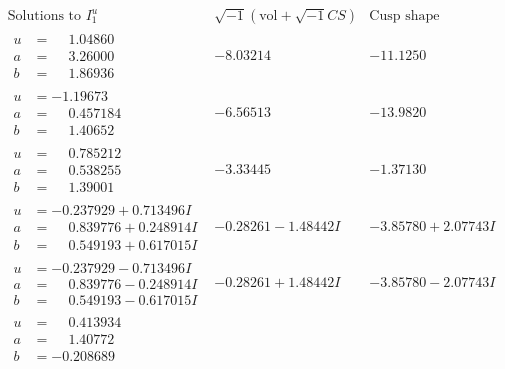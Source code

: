 \documentclass[1p]{elsarticle_modified}
\theoremstyle{definition}
\newcommand{\I}{\sqrt{-1}}
\begin{document}
$$\begin{array}{c|c|c}  
\text{Solutions to }I^u_{1}& \I (\text{vol} + \sqrt{-1}CS) & \text{Cusp shape}\\
 \hline 
\begin{aligned}
u &= \phantom{-}1.04860\phantom{ +0.000000I} \\
a &= \phantom{-}3.26000\phantom{ +0.000000I} \\
b &= \phantom{-}1.86936\phantom{ +0.000000I}\end{aligned}
 & -8.03214\phantom{ +0.000000I} & -11.1250\phantom{ +0.000000I} \\ \hline\begin{aligned}
u &= -1.19673\phantom{ +0.000000I} \\
a &= \phantom{-}0.457184\phantom{ +0.000000I} \\
b &= \phantom{-}1.40652\phantom{ +0.000000I}\end{aligned}
 & -6.56513\phantom{ +0.000000I} & -13.9820\phantom{ +0.000000I} \\ \hline\begin{aligned}
u &= \phantom{-}0.785212\phantom{ +0.000000I} \\
a &= \phantom{-}0.538255\phantom{ +0.000000I} \\
b &= \phantom{-}1.39001\phantom{ +0.000000I}\end{aligned}
 & -3.33445\phantom{ +0.000000I} & -1.37130\phantom{ +0.000000I} \\ \hline\begin{aligned}
u &= -0.237929 + 0.713496 I \\
a &= \phantom{-}0.839776 + 0.248914 I \\
b &= \phantom{-}0.549193 + 0.617015 I\end{aligned}
 & -0.28261 - 1.48442 I & -3.85780 + 2.07743 I \\ \hline\begin{aligned}
u &= -0.237929 - 0.713496 I \\
a &= \phantom{-}0.839776 - 0.248914 I \\
b &= \phantom{-}0.549193 - 0.617015 I\end{aligned}
 & -0.28261 + 1.48442 I & -3.85780 - 2.07743 I \\ \hline\begin{aligned}
u &= \phantom{-}0.413934\phantom{ +0.000000I} \\
a &= \phantom{-}1.40772\phantom{ +0.000000I} \\
b &= -0.208689\phantom{ +0.000000I}\end{aligned}

\end{array}$$
\end{document}
